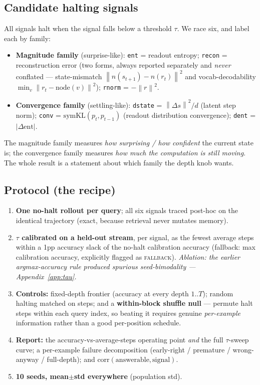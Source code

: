 \documentclass{article}
\newcommand{\norm}[1]{\left\lVert #1 \right\rVert}
\newcommand{\sig}[1]{\texttt{#1}}
\begin{document}
\subsection{Candidate halting signals}\label{sec:signals}
All signals halt when the signal falls below a threshold $\tau$. We race six,
and label each by family:
\begin{itemize}
  \item \textbf{Magnitude family} (surprise-like): \sig{ent} = readout entropy;
  \sig{recon} = reconstruction error (two forms, always reported separately and
  \emph{never} conflated --- state-mismatch
  $\norm{n(s_{t+1})-n(r_t)}^2$ and vocab-decodability
  $\min_v \norm{r_t - \mathrm{node}(v)}^2$); \sig{rnorm} = $-\norm{r}^2$.
  \item \textbf{Convergence family} (settling-like): \sig{dstate} =
  $\norm{\Delta s}^2/d$ (latent step norm); \sig{conv} =
  $\mathrm{symKL}(p_t, p_{t-1})$ (readout distribution convergence);
  \sig{dent} = $|\Delta \mathrm{ent}|$.
\end{itemize}
The magnitude family measures \emph{how surprising / how confident} the current
state is; the convergence family measures \emph{how much the computation is
still moving}. The whole result is a statement about which family the depth
knob wants.

\subsection{Protocol (the recipe)}\label{sec:protocol}
\begin{enumerate}
  \item \textbf{One no-halt rollout per query}; all six signals traced post-hoc
  on the identical trajectory (exact, because retrieval never mutates memory).
  \item \textbf{$\tau$ calibrated on a held-out stream}, per signal, as the
  fewest average steps within a 1pp accuracy slack of the no-halt calibration
  accuracy (fallback: max calibration accuracy, explicitly flagged as
  \textsc{fallback}). \emph{Ablation: the earlier argmax-accuracy rule produced
  spurious seed-bimodality --- Appendix~\ref{app:tau}.}
  \item \textbf{Controls:} fixed-depth frontier (accuracy at every depth
  $1..T$); random halting matched on steps; and a \textbf{within-block shuffle
  null} --- permute halt steps within each query index, so beating it requires
  genuine \emph{per-example} information rather than a good per-position
  schedule.
  \item \textbf{Report:} the accuracy-vs-average-steps operating point
  \emph{and} the full $\tau$-sweep curve; a per-example failure decomposition
  (early-right / premature / wrong-anyway / full-depth); and
  $\mathrm{corr}(\text{answerable}, \text{signal})$.
  \item \textbf{10 seeds, mean$\pm$std everywhere} (population std).
\end{enumerate}
\end{document}

